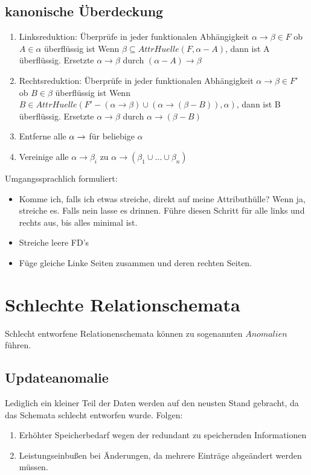 \subsection{kanonische Überdeckung}
\begin{enumerate}
\item Linksreduktion: Überprüfe in jeder funktionalen Abhängigkeit $ \alpha \rightarrow \beta \in F $ ob $ A \in \alpha $ überflüssig ist
\subitem Wenn $ \beta \subseteq AttrHuelle(F,\alpha - A) $, dann ist A überflüssig. Ersetzte $ \alpha \rightarrow \beta $ durch $ (\alpha - A)\rightarrow \beta $
\item Rechtsreduktion: Überprüfe in jeder funktionalen Abhängigkeit $ \alpha \rightarrow \beta \in F' $ ob $ B \in \beta $ überflüssig ist
\subitem Wenn $ B \in AttrHuelle(F' - (\alpha \rightarrow \beta) \cup (\alpha \rightarrow (\beta - B)), \alpha) $, dann ist B überflüssig. Ersetzte $ \alpha \rightarrow \beta $ durch $ \alpha \rightarrow (\beta - B) $
\item Entferne alle $ \alpha \rightarrow \empty $ für beliebige $ \alpha $
\item Vereinige alle $ \alpha \rightarrow \beta_i $ zu $ \alpha \rightarrow (\beta_1 \cup \ldots \cup \beta_n ) $
\end{enumerate}
Umgangssprachlich formuliert:
\begin{itemize}
\item Komme ich, falls ich etwas streiche, direkt auf meine Attributhülle? Wenn ja, streiche es. Falls nein lasse es drinnen. Führe diesen Schritt für alle links und rechts aus, bis alles minimal ist. 
\item Streiche leere FD's 
\item Füge gleiche Linke Seiten zusammen und deren rechten Seiten. 
\end{itemize}
\section{\glqq Schlechte \grqq Relationschemata}
Schlecht entworfene Relationenschemata können zu sogenannten $Anomalien$ führen.
\subsection{Updateanomalie}
Lediglich ein kleiner Teil der Daten werden auf den neusten Stand gebracht, da das Schemata schlecht entworfen wurde. Folgen:
\begin{enumerate}
\item Erhöhter Speicherbedarf wegen der redundant zu speichernden Informationen
\item Leistungseinbußen bei Änderungen, da mehrere Einträge abgeändert werden müssen. 
\end{enumerate}

